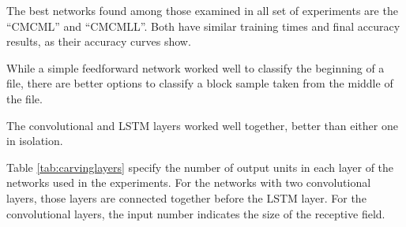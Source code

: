 The best networks found among those examined in all set of experiments are the ``CMCML'' and ``CMCMLL''. Both have similar training times and final accuracy results, as their accuracy curves show. 

While a simple feedforward network worked well to classify the beginning of a file, there are better options to classify a block sample taken from the middle of the file.

The convolutional and LSTM layers worked well together, better than either one in isolation.

Table \ref{tab:carvinglayers} specify the number of output units in each layer of the networks used in the experiments. For the networks with two convolutional layers, those layers are connected together before the LSTM layer. For the convolutional layers, the input number indicates the size of the receptive field. 
